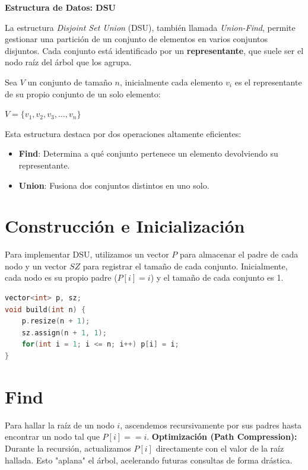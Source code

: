 \documentclass{article}
\begin{document}
\begin{center}
    \huge \textbf{Estructura de Datos: DSU}
    \vspace{0.5cm}
\end{center}
La estructura \emph{Disjoint Set Union} (DSU), también llamada \emph{Union-Find}, permite gestionar una partición de un conjunto de elementos en varios conjuntos disjuntos. Cada conjunto está identificado por un \textbf{representante}, que suele ser el nodo raíz del árbol que los agrupa.

Sea $V$ un conjunto de tamaño $n$, inicialmente cada elemento $v_i$ es el representante de su propio conjunto de un solo elemento:
\begin{center}
    $V=\{v_1, v_2, v_3, \dots, v_n\}$    
\end{center}



Esta estructura destaca por dos operaciones altamente eficientes:
\begin{itemize}
    \item \textbf{Find}: Determina a qué conjunto pertenece un elemento devolviendo su representante.
    \item \textbf{Union}: Fusiona dos conjuntos distintos en uno solo.
\end{itemize}

\section{Construcción e Inicialización}
Para implementar DSU, utilizamos un vector $P$ para almacenar el padre de cada nodo y un vector $SZ$ para registrar el tamaño de cada conjunto. Inicialmente, cada nodo es su propio padre ($P[i] = i$) y el tamaño de cada conjunto es 1.

\begin{lstlisting}[language=C++, caption=Constructor de la clase DSU]
vector<int> p, sz;
void build(int n) {
    p.resize(n + 1);
    sz.assign(n + 1, 1);
    for(int i = 1; i <= n; i++) p[i] = i;
}
\end{lstlisting}

\section{Find}
Para hallar la raíz de un nodo $i$, ascendemos recursivamente por sus padres hasta encontrar un nodo tal que $P[i] == i$. 
\textbf{Optimización (Path Compression):} Durante la recursión, actualizamos $P[i]$ directamente con el valor de la raíz hallada. Esto "aplana" el árbol, acelerando futuras consultas de forma drástica.
\end{document}
